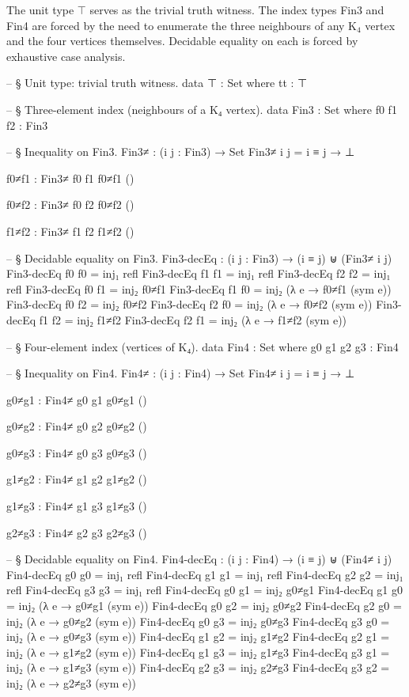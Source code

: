 \documentclass[11pt,a4paper]{book}
\def\texttt#1{#1}%
\begin{document}
The unit type $\top$ serves as the trivial truth witness. The index types \texttt{Fin3}
and \texttt{Fin4} are forced by the need to enumerate the three neighbours of any K$_4$
vertex and the four vertices themselves. Decidable equality on each is forced by
exhaustive case analysis.

\begin{code}
-- § Unit type: trivial truth witness.
data ⊤ : Set where
  tt : ⊤

-- § Three-element index (neighbours of a K₄ vertex).
data Fin3 : Set where
  f0 f1 f2 : Fin3

-- § Inequality on Fin3.
Fin3≠ : (i j : Fin3) → Set
Fin3≠ i j = i ≡ j → ⊥

f0≠f1 : Fin3≠ f0 f1
f0≠f1 ()

f0≠f2 : Fin3≠ f0 f2
f0≠f2 ()

f1≠f2 : Fin3≠ f1 f2
f1≠f2 ()

-- § Decidable equality on Fin3.
Fin3-decEq : (i j : Fin3) → (i ≡ j) ⊎ (Fin3≠ i j)
Fin3-decEq f0 f0 = inj₁ refl
Fin3-decEq f1 f1 = inj₁ refl
Fin3-decEq f2 f2 = inj₁ refl
Fin3-decEq f0 f1 = inj₂ f0≠f1
Fin3-decEq f1 f0 = inj₂ (λ e → f0≠f1 (sym e))
Fin3-decEq f0 f2 = inj₂ f0≠f2
Fin3-decEq f2 f0 = inj₂ (λ e → f0≠f2 (sym e))
Fin3-decEq f1 f2 = inj₂ f1≠f2
Fin3-decEq f2 f1 = inj₂ (λ e → f1≠f2 (sym e))

-- § Four-element index (vertices of K₄).
data Fin4 : Set where
  g0 g1 g2 g3 : Fin4

-- § Inequality on Fin4.
Fin4≠ : (i j : Fin4) → Set
Fin4≠ i j = i ≡ j → ⊥

g0≠g1 : Fin4≠ g0 g1
g0≠g1 ()

g0≠g2 : Fin4≠ g0 g2
g0≠g2 ()

g0≠g3 : Fin4≠ g0 g3
g0≠g3 ()

g1≠g2 : Fin4≠ g1 g2
g1≠g2 ()

g1≠g3 : Fin4≠ g1 g3
g1≠g3 ()

g2≠g3 : Fin4≠ g2 g3
g2≠g3 ()

-- § Decidable equality on Fin4.
Fin4-decEq : (i j : Fin4) → (i ≡ j) ⊎ (Fin4≠ i j)
Fin4-decEq g0 g0 = inj₁ refl
Fin4-decEq g1 g1 = inj₁ refl
Fin4-decEq g2 g2 = inj₁ refl
Fin4-decEq g3 g3 = inj₁ refl
Fin4-decEq g0 g1 = inj₂ g0≠g1
Fin4-decEq g1 g0 = inj₂ (λ e → g0≠g1 (sym e))
Fin4-decEq g0 g2 = inj₂ g0≠g2
Fin4-decEq g2 g0 = inj₂ (λ e → g0≠g2 (sym e))
Fin4-decEq g0 g3 = inj₂ g0≠g3
Fin4-decEq g3 g0 = inj₂ (λ e → g0≠g3 (sym e))
Fin4-decEq g1 g2 = inj₂ g1≠g2
Fin4-decEq g2 g1 = inj₂ (λ e → g1≠g2 (sym e))
Fin4-decEq g1 g3 = inj₂ g1≠g3
Fin4-decEq g3 g1 = inj₂ (λ e → g1≠g3 (sym e))
Fin4-decEq g2 g3 = inj₂ g2≠g3
Fin4-decEq g3 g2 = inj₂ (λ e → g2≠g3 (sym e))
\end{code}
\end{document}
